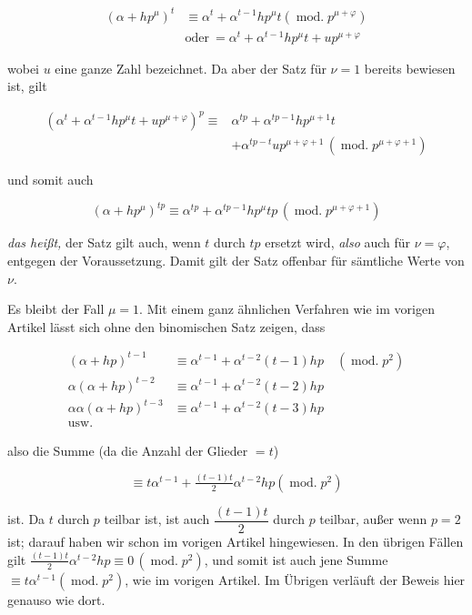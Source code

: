 \[\begin{aligned}
(\alpha+hp^{\mu})^t&\equiv\alpha^t+\alpha^{t-1}hp^{\mu}t(\operatorname{mod.}p^{\mu+\varphi})\\
&\text{oder}\ =\alpha^t+\alpha^{t-1}hp^{\mu}t+up^{\mu+\varphi}
\end{aligned}\]

\noindent wobei $u$ eine ganze Zahl bezeichnet. Da aber der Satz für $\nu=1$ bereits bewiesen ist, gilt

\[\begin{aligned}
(\alpha^t+\alpha^{t-1}hp^{\mu}t+up^{\mu+\varphi})^p\equiv{}&\alpha^{tp}+\alpha^{tp-1}hp^{\mu+1}t\\
&+\alpha^{tp-t}up^{\mu+\varphi+1}\,(\operatorname{mod.}p^{\mu+\varphi+1})
\end{aligned}\]

\noindent und somit auch

\[(\alpha+hp^{\mu})^{tp}\equiv\alpha^{tp}+\alpha^{tp-1}hp^{\mu}tp\,(\operatorname{mod.}p^{\mu+\varphi+1})\]

\noindent \emph{das heißt,} der Satz gilt auch, wenn $t$ durch $tp$ ersetzt wird, \emph{also} auch für $\nu=\varphi$, entgegen der Voraussetzung. Damit gilt der Satz offenbar für sämtliche Werte von $\nu$.

Es bleibt der Fall $\mu=1$. Mit einem ganz ähnlichen Verfahren wie im vorigen Artikel lässt sich ohne den binomischen Satz zeigen, dass

\[\begin{aligned}
(\alpha+hp)^{t-1}&\equiv\alpha^{t-1}+\alpha^{t-2}(t-1)hp\quad(\operatorname{mod.}p^2)\\
\alpha(\alpha+hp)^{t-2}&\equiv\alpha^{t-1}+\alpha^{t-2}(t-2)hp\\
\alpha\alpha(\alpha+hp)^{t-3}&\equiv\alpha^{t-1}+\alpha^{t-2}(t-3)hp\\
\text{usw.}\quad&
\end{aligned}\]

\noindent also die Summe (da die Anzahl der Glieder $=t$)

\[\equiv t\alpha^{t-1}+\tfrac{(t-1)t}{2}\alpha^{t-2}hp(\operatorname{mod.}p^2)\]

ist. Da $t$ durch $p$ teilbar ist, ist auch $\dfrac{(t-1)t}{2}$ durch $p$ teilbar, außer wenn $p=2$ ist; darauf haben wir schon im vorigen Artikel hingewiesen. In den übrigen Fällen gilt $\tfrac{(t-1)t}{2}\alpha^{t-2}hp\equiv0\,(\operatorname{mod.}p^2)$, und somit ist auch jene Summe $\equiv t\alpha^{t-1}(\operatorname{mod.}p^2)$, wie im vorigen Artikel. Im Übrigen verläuft der Beweis hier genauso wie dort.

